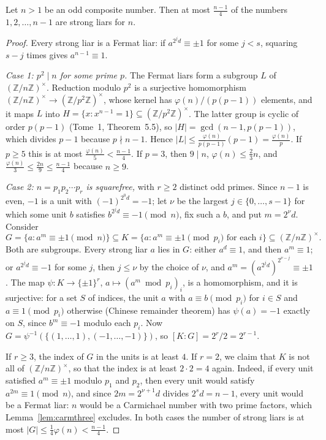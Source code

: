 \begin{theorem}\label{thm:mr}
Let $n>1$ be an odd composite number. Then at most $\frac{n-1}4$ of the numbers $1,2,\dots,n-1$ are strong liars for $n$.
\end{theorem}
\begin{proof}
Every strong liar is a Fermat liar: if $a^{2^jd}\equiv\pm1$ for some $j<s$, squaring $s-j$ times gives $a^{n-1}\equiv1$.

\emph{Case 1: $p^2\mid n$ for some prime $p$.} The Fermat liars form a subgroup $L$ of $(\mathbb Z/n\mathbb Z)^\times$. Reduction modulo $p^2$ is a surjective homomorphism $(\mathbb Z/n\mathbb Z)^\times\to(\mathbb Z/p^2\mathbb Z)^\times$, whose kernel has $\varphi(n)/(p(p-1))$ elements, and it maps $L$ into $H=\{x:x^{n-1}=1\}\subseteq(\mathbb Z/p^2\mathbb Z)^\times$. The latter group is cyclic of order $p(p-1)$ (Tome~1, Theorem~5.5), so $|H|=\gcd(n-1,p(p-1))$, which divides $p-1$ because $p\nmid n-1$. Hence
$|L|\le\frac{\varphi(n)}{p(p-1)}(p-1)=\frac{\varphi(n)}p$. If $p\ge5$ this is at most $\frac{\varphi(n)}5<\frac{n-1}4$. If $p=3$, then $9\mid n$, $\varphi(n)\le\frac23n$, and $\frac{\varphi(n)}3\le\frac{2n}9\le\frac{n-1}4$ because $n\ge9$.

\emph{Case 2: $n=p_1p_2\cdots p_r$ is squarefree,} with $r\ge2$ distinct odd primes. Since $n-1$ is even, $-1$ is a unit with $(-1)^{2^0d}=-1$; let $\nu$ be the largest $j\in\{0,\dots,s-1\}$ for which some unit $b$ satisfies $b^{2^jd}\equiv-1\pmod n$, fix such a $b$, and put $m=2^\nu d$. Consider
\[
G=\{a:a^m\equiv\pm1\pmod n\}\subseteq K=\{a:a^m\equiv\pm1\pmod{p_i}\text{ for each }i\}\subseteq(\mathbb Z/n\mathbb Z)^\times.
\]
Both are subgroups. Every strong liar $a$ lies in $G$: either $a^d\equiv1$, and then $a^m\equiv1$; or $a^{2^jd}\equiv-1$ for some $j$, then $j\le\nu$ by the choice of $\nu$, and $a^m=(a^{2^jd})^{2^{\nu-j}}\equiv\pm1$.
The map $\psi:K\to\{\pm1\}^r$, $a\mapsto(a^m\bmod p_i)_i$, is a homomorphism, and it is surjective: for a set $S$ of indices, the unit $a$ with $a\equiv b\pmod{p_i}$ for $i\in S$ and $a\equiv1\pmod{p_i}$ otherwise (Chinese remainder theorem) has $\psi(a)=-1$ exactly on $S$, since $b^m\equiv-1$ modulo each $p_i$.
Now $G=\psi^{-1}(\{(1,\dots,1),(-1,\dots,-1)\})$, so $[K:G]=2^r/2=2^{r-1}$.

If $r\ge3$, the index of $G$ in the units is at least $4$. If $r=2$, we claim that $K$ is not all of $(\mathbb Z/n\mathbb Z)^\times$, so that the index is at least $2\cdot2=4$ again. Indeed, if every unit satisfied $a^m\equiv\pm1$ modulo $p_1$ and $p_2$, then every unit would satisfy $a^{2m}\equiv1\pmod n$, and since $2m=2^{\nu+1}d$ divides $2^sd=n-1$, every unit would be a Fermat liar:
$n$ would be a Carmichael number with two prime factors, which Lemma~\ref{lem:carmthree} excludes. In both cases the number of strong liars is at most $|G|\le\frac14\varphi(n)<\frac{n-1}4$.
\end{proof}

